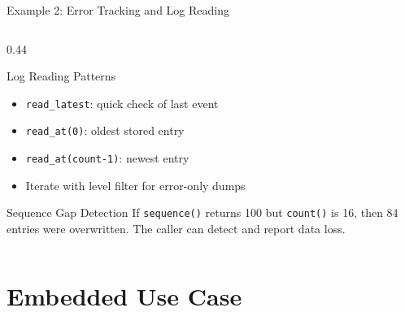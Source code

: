 \documentclass[aspectratio=169, 10pt]{beamer}
\begin{document}
\begin{frame}[fragile]{Example 2: Error Tracking and Log Reading}
\begin{columns}[T]
\begin{column}{0.44\textwidth}
\vspace{0.5em}
\begin{block}{Log Reading Patterns}
\begin{itemize}
  \item \texttt{read\_latest}: quick check of last event
  \item \texttt{read\_at(0)}: oldest stored entry
  \item \texttt{read\_at(count-1)}: newest entry
  \item Iterate with level filter for error-only dumps
\end{itemize}
\end{block}

\begin{alertblock}{Sequence Gap Detection}
If \texttt{sequence()} returns 100 but \texttt{count()} is 16,
then 84 entries were overwritten. The caller can detect and
report data loss.
\end{alertblock}
\end{column}
\end{columns}
\end{frame}

\section{Embedded Use Case}
\end{document}
